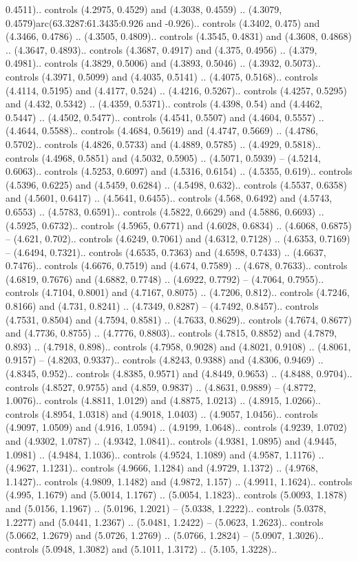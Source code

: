 0.4511).. controls (4.2975, 0.4529) and (4.3038, 0.4559) .. (4.3079, 0.4579)arc(63.3287:61.3435:0.926 and -0.926).. controls (4.3402, 0.475) and (4.3466, 0.4786) .. (4.3505, 0.4809).. controls (4.3545, 0.4831) and (4.3608, 0.4868) .. (4.3647, 0.4893).. controls (4.3687, 0.4917) and (4.375, 0.4956) .. (4.379, 0.4981).. controls (4.3829, 0.5006) and (4.3893, 0.5046) .. (4.3932, 0.5073).. controls (4.3971, 0.5099) and (4.4035, 0.5141) .. (4.4075, 0.5168).. controls (4.4114, 0.5195) and (4.4177, 0.524) .. (4.4216, 0.5267).. controls (4.4257, 0.5295) and (4.432, 0.5342) .. (4.4359, 0.5371).. controls (4.4398, 0.54) and (4.4462, 0.5447) .. (4.4502, 0.5477).. controls (4.4541, 0.5507) and (4.4604, 0.5557) .. (4.4644, 0.5588).. controls (4.4684, 0.5619) and (4.4747, 0.5669) .. (4.4786, 0.5702).. controls (4.4826, 0.5733) and (4.4889, 0.5785) .. (4.4929, 0.5818).. controls (4.4968, 0.5851) and (4.5032, 0.5905) .. (4.5071, 0.5939) -- (4.5214, 0.6063).. controls (4.5253, 0.6097) and (4.5316, 0.6154) .. (4.5355, 0.619).. controls (4.5396, 0.6225) and (4.5459, 0.6284) .. (4.5498, 0.632).. controls (4.5537, 0.6358) and (4.5601, 0.6417) .. (4.5641, 0.6455).. controls (4.568, 0.6492) and (4.5743, 0.6553) .. (4.5783, 0.6591).. controls (4.5822, 0.6629) and (4.5886, 0.6693) .. (4.5925, 0.6732).. controls (4.5965, 0.6771) and (4.6028, 0.6834) .. (4.6068, 0.6875) -- (4.621, 0.702).. controls (4.6249, 0.7061) and (4.6312, 0.7128) .. (4.6353, 0.7169) -- (4.6494, 0.7321).. controls (4.6535, 0.7363) and (4.6598, 0.7433) .. (4.6637, 0.7476).. controls (4.6676, 0.7519) and (4.674, 0.7589) .. (4.678, 0.7633).. controls (4.6819, 0.7676) and (4.6882, 0.7748) .. (4.6922, 0.7792) -- (4.7064, 0.7955).. controls (4.7104, 0.8001) and (4.7167, 0.8075) .. (4.7206, 0.812).. controls (4.7246, 0.8166) and (4.731, 0.8241) .. (4.7349, 0.8287) -- (4.7492, 0.8457).. controls (4.7531, 0.8504) and (4.7594, 0.8581) .. (4.7633, 0.8629).. controls (4.7674, 0.8677) and (4.7736, 0.8755) .. (4.7776, 0.8803).. controls (4.7815, 0.8852) and (4.7879, 0.893) .. (4.7918, 0.898).. controls (4.7958, 0.9028) and (4.8021, 0.9108) .. (4.8061, 0.9157) -- (4.8203, 0.9337).. controls (4.8243, 0.9388) and (4.8306, 0.9469) .. (4.8345, 0.952).. controls (4.8385, 0.9571) and (4.8449, 0.9653) .. (4.8488, 0.9704).. controls (4.8527, 0.9755) and (4.859, 0.9837) .. (4.8631, 0.9889) -- (4.8772, 1.0076).. controls (4.8811, 1.0129) and (4.8875, 1.0213) .. (4.8915, 1.0266).. controls (4.8954, 1.0318) and (4.9018, 1.0403) .. (4.9057, 1.0456).. controls (4.9097, 1.0509) and (4.916, 1.0594) .. (4.9199, 1.0648).. controls (4.9239, 1.0702) and (4.9302, 1.0787) .. (4.9342, 1.0841).. controls (4.9381, 1.0895) and (4.9445, 1.0981) .. (4.9484, 1.1036).. controls (4.9524, 1.1089) and (4.9587, 1.1176) .. (4.9627, 1.1231).. controls (4.9666, 1.1284) and (4.9729, 1.1372) .. (4.9768, 1.1427).. controls (4.9809, 1.1482) and (4.9872, 1.157) .. (4.9911, 1.1624).. controls (4.995, 1.1679) and (5.0014, 1.1767) .. (5.0054, 1.1823).. controls (5.0093, 1.1878) and (5.0156, 1.1967) .. (5.0196, 1.2021) -- (5.0338, 1.2222).. controls (5.0378, 1.2277) and (5.0441, 1.2367) .. (5.0481, 1.2422) -- (5.0623, 1.2623).. controls (5.0662, 1.2679) and (5.0726, 1.2769) .. (5.0766, 1.2824) -- (5.0907, 1.3026).. controls (5.0948, 1.3082) and (5.1011, 1.3172) .. (5.105, 1.3228).. 